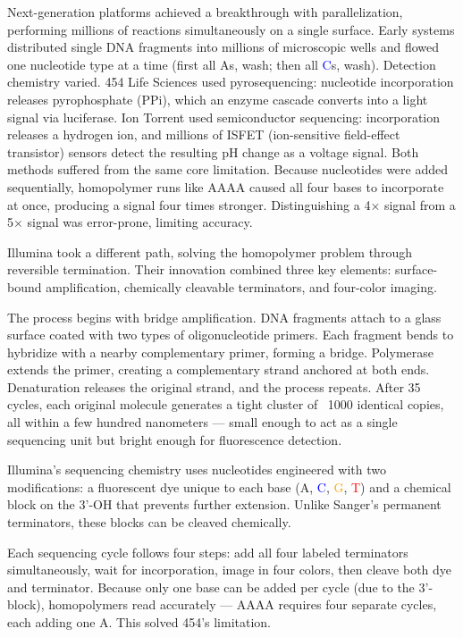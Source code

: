 Next-generation platforms achieved a breakthrough with parallelization, performing millions of reactions simultaneously on a single surface. Early systems distributed single DNA fragments into millions of microscopic wells and flowed one nucleotide type at a time (first all \textcolor{green!60!black}{A}s, wash; then all \textcolor{blue}{C}s, wash). Detection chemistry varied. 454 Life Sciences used pyrosequencing: nucleotide incorporation releases pyrophosphate (PPi), which an enzyme cascade converts into a light signal via luciferase. Ion Torrent used semiconductor sequencing: incorporation releases a hydrogen ion, and millions of ISFET (ion-sensitive field-effect transistor) sensors detect the resulting pH change as a voltage signal. Both methods suffered from the same core limitation. Because nucleotides were added sequentially, homopolymer runs like \textcolor{green!60!black}{A}\textcolor{green!60!black}{A}\textcolor{green!60!black}{A}\textcolor{green!60!black}{A} caused all four bases to incorporate at once, producing a signal four times stronger. Distinguishing a 4× signal from a 5× signal was error-prone, limiting accuracy.

Illumina took a different path, solving the homopolymer problem through reversible termination. Their innovation combined three key elements: surface-bound amplification, chemically cleavable terminators, and four-color imaging.

The process begins with bridge amplification. DNA fragments attach to a glass surface coated with two types of oligonucleotide primers. Each fragment bends to hybridize with a nearby complementary primer, forming a bridge. Polymerase extends the primer, creating a complementary strand anchored at both ends. Denaturation releases the original strand, and the process repeats. After 35 cycles, each original molecule generates a tight cluster of ~1000 identical copies, all within a few hundred nanometers — small enough to act as a single sequencing unit but bright enough for fluorescence detection.

Illumina's sequencing chemistry uses nucleotides engineered with two modifications: a fluorescent dye unique to each base (\textcolor{green!60!black}{A}, \textcolor{blue}{C}, \textcolor{orange}{G}, \textcolor{red}{T}) and a chemical block on the 3'-OH that prevents further extension. Unlike Sanger's permanent terminators, these blocks can be cleaved chemically.

Each sequencing cycle follows four steps: add all four labeled terminators simultaneously, wait for incorporation, image in four colors, then cleave both dye and terminator. Because only one base can be added per cycle (due to the 3'-block), homopolymers read accurately — \textcolor{green!60!black}{A}\textcolor{green!60!black}{A}\textcolor{green!60!black}{A}\textcolor{green!60!black}{A} requires four separate cycles, each adding one \textcolor{green!60!black}{A}. This solved 454's limitation.

